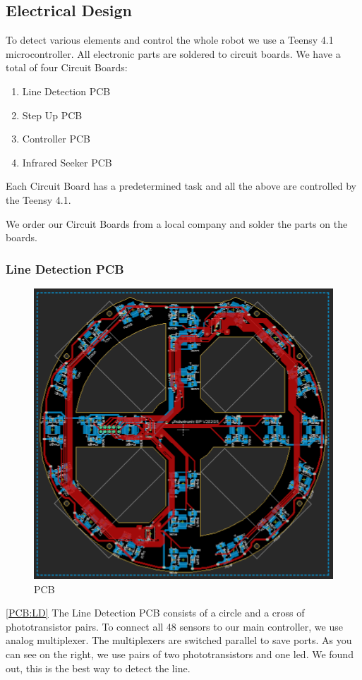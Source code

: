 \documentclass{scrartcl}
\begin{document}
\subsection{Electrical Design}
To detect various elements and control the whole robot we use a Teensy 4.1 microcontroller. All electronic
parts are soldered to circuit boards.
\newline
We have a total of four Circuit Boards:
\begin{enumerate}
    \item{Line Detection PCB} \label{PCB:LD}
    \item{Step Up PCB} \label{PCB:SU}
    \item{Controller PCB} \label{PCB:C}
    \item{Infrared Seeker PCB} \label{PCB:IS}
\end{enumerate}
Each Circuit Board has a predetermined task and all the above are controlled by the Teensy 4.1.

We order our Circuit Boards from a local company and solder the parts on the boards.

\subsubsection{Line Detection PCB}

\begin{figure}
    \centering
    \includegraphics[width=0.75\linewidth]{img/eagle/LineDedectionPCB.png}
    \caption{PCB}
    \label{fig:LDPCB}
\end{figure}

\ref{PCB:LD} The Line Detection PCB consists of a circle and a cross of phototransistor pairs. To connect all
48 sensors to our main controller, we use analog multiplexer. The multiplexers are switched parallel
to save ports.
\newline
As you can see on the right, we use pairs of two phototransistors and one led. We found out, this is the 
best way to detect the line.
\end{document}
